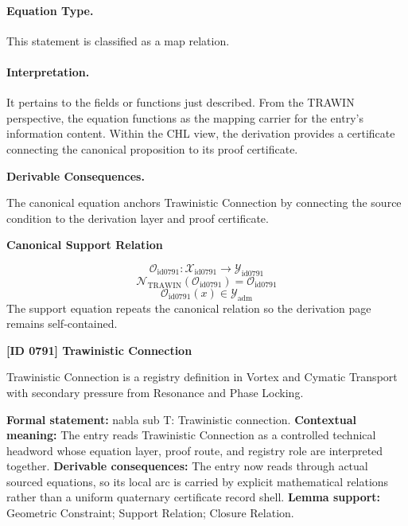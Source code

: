\paragraph{Equation Type.}
This statement is classified as a map relation.

\paragraph{Interpretation.}
It pertains to the fields or functions just described. From the TRAWIN perspective, the equation functions as the mapping carrier for the entry’s information content. Within the CHL view, the derivation provides a certificate connecting the canonical proposition to its proof certificate.

\par\vspace{0.35em}
\noindent\textbf{Derivable Consequences.}\quad
\begingroup
\footnotesize
\raggedright
The canonical equation anchors Trawinistic Connection by connecting the source condition to the derivation layer and proof certificate.
\par\endgroup

\noindent\textbf{Canonical Support Relation}\par
\[
\mathcal{O}_{\mathrm{id0791}}:\mathcal{X}_{\mathrm{id0791}}\longrightarrow\mathcal{Y}_{\mathrm{id0791}}
\]
\[
\mathcal{N}_{\mathrm{TRAWIN}}(\mathcal{O}_{\mathrm{id0791}})=\mathcal{O}_{\mathrm{id0791}}
\]
\[
\mathcal{O}_{\mathrm{id0791}}(x)\in\mathcal{Y}_{\mathrm{adm}}
\]
\noindent The support equation repeats the canonical relation so the derivation page remains self-contained.\par

\clearpage
\noindent\textbf{[ID 0791] Trawinistic Connection}\par
\vspace{0.35em}
\begingroup\small
{}
Trawinistic Connection is a registry definition in Vortex and Cymatic Transport with secondary pressure from Resonance and Phase Locking.

\begingroup\footnotesize\setlength{\emergencystretch}{3em}\sloppy
\textbf{Formal statement:} nabla sub T: Trawinistic connection. \textbf{Contextual meaning:} The entry reads Trawinistic Connection as a controlled technical headword whose equation layer, proof route, and registry role are interpreted together. \textbf{Derivable consequences:} The entry now reads through actual sourced equations, so its local arc is carried by explicit mathematical relations rather than a uniform quaternary certificate record shell. \textbf{Lemma support:} Geometric Constraint; Support Relation; Closure Relation.\par
\endgroup

